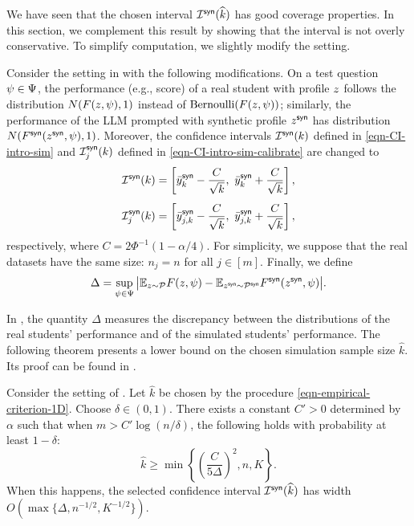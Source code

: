 We have seen that the chosen interval $\mathcal{I}^{\mathsf{syn}}(\widehat{k})$ has good coverage properties. In this section, we complement this result by showing that the interval is not overly conservative. To simplify computation, we slightly modify the setting.

\begin{example}\label{example-gaussian}
Consider the setting in  with the following modifications. On a test question $\psi \in\Psi$, the performance (e.g., score) of a real student with profile $z$ follows the distribution $N( F ( z , \psi ),1)$ instead of $\mathrm{Bernoulli} ( F ( z , \psi ) )$; similarly, the performance of the LLM prompted with synthetic profile $z^{\mathsf{syn}}$ has distribution $N( F^{\mathsf{syn}} (  z^{\mathsf{syn}}, \psi ),1)$. Moreover, the confidence intervals $\mathcal{I}^{\mathsf{syn}}(k)$ defined in \eqref{eqn-CI-intro-sim} and $\mathcal{I}^{\mathsf{syn}}_j(k)$ defined in \eqref{eqn-CI-intro-sim-calibrate} are changed to
\begin{align*}
& \mathcal{I}^{\mathsf{syn}}(k) = \left[ \bar{y}^{\mathsf{syn}}_k - \frac{C}{\sqrt{k}},~ \bar{y}^{\mathsf{syn}}_k + \frac{C}{\sqrt{k}} \right], \\[4pt]
& \mathcal{I}^{\mathsf{syn}}_j(k) = \left[ \bar{y}^{\mathsf{syn}}_{j,k} - \frac{C}{\sqrt{k}},~ \bar{y}^{\mathsf{syn}}_{j,k} + \frac{C}{\sqrt{k}} \right],
\end{align*}
respectively, where $C = 2 \Phi^{-1} (1 - \alpha / 4)$. For simplicity, we suppose that the real datasets have the same size: $n_j=n$ for all $j\in[m]$. Finally, we define
\[
\Delta = \sup_{\psi \in \Psi} \big| \mathbb{E}_{z \sim \mathcal{P}} F ( z , \psi ) - \mathbb{E}_{z^{\mathsf{syn}} \sim \mathcal{P}^{\mathsf{syn}}} F^{\mathsf{syn}} ( z^{\mathsf{syn}} , \psi ) \big|.
\]
\end{example}

In , the quantity $\Delta$ measures the discrepancy between the distributions of the real students' performance and of the simulated students' performance. The following theorem presents a lower bound on the chosen simulation sample size $\widehat{k}$. Its proof can be found in .

\begin{theorem}\label{thm-sharpness-1D}
Consider the setting of . Let $\widehat{k}$ be chosen by the procedure \eqref{eqn-empirical-criterion-1D}. Choose $\delta \in (0, 1)$. There exists a constant $C'>0$ determined by $\alpha$ such that when $m  > C' \log(n / \delta)$, the following holds with probability at least $1 - \delta$:
\[
\widehat{k} \ge \min \left\{
\left(
\frac{C}{5 \Delta}
\right)^2,
n,  K
\right\}.
\]
When this happens, the selected confidence interval $\mathcal{I}^{\mathsf{syn}}(\widehat{k})$ has width $O\left( \max\{\Delta, n^{-1/2}, K^{-1/2} \} \right)$.
\end{theorem}

